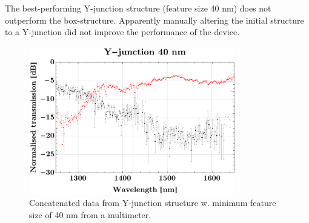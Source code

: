 The best-performing Y-junction structure (feature size 40 nm) does not outperform the box-structure. Apparently manually altering the initial structure to a Y-junction did not improve the performance of the device.

\begin{figure}[H]
    \centering
    \includegraphics[width=0.8\textwidth]
    {fig/Kilde2Multimeter/yjunc40multimeterconcatenated.pdf}
    \caption{Concatenated data from Y-junction structure w. minimum feature size of 40 nm from a multimeter.}
    \label{fig:Yjunc40nmKilde2Concatenated}
\end{figure}
